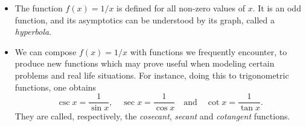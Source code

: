 \documentclass{ximera}
\begin{document}

\begin{summary}\begin{itemize}
\item The function $f(x) = 1/x$ is defined for all non-zero values of $x$. It is an odd function, and its asymptotics can be understood by its graph, called a \emph{hyperbola}.
\item We can compose $f(x) = 1/x$ with functions we frequently encounter, to produce new functions which may prove useful when modeling certain problems and real life situations. For instance, doing this to trigonometric functions, one obtains $$   \csc x = \frac{1}{\sin x}, \quad \sec x = \frac{1}{\cos x} \quad\mbox{and} \quad \cot x = \frac{1}{\tan x}.  $$They are called, respectively, the \emph{cosecant}, \emph{secant} and \emph{cotangent} functions.
\end{itemize}\end{summary}
\end{document}

